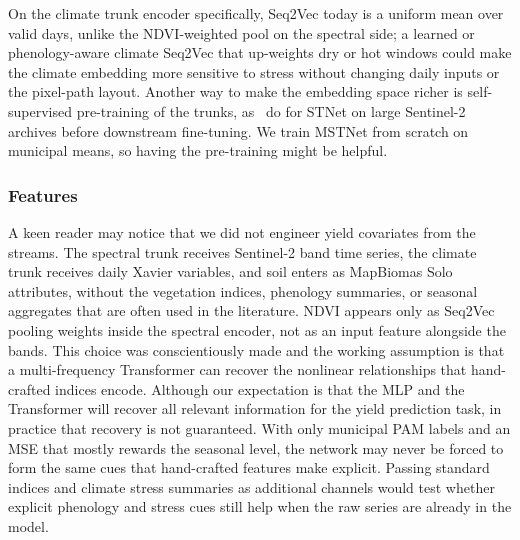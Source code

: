 On the climate trunk encoder specifically, Seq2Vec today is a uniform mean over valid days, unlike the NDVI-weighted pool on the spectral side; a learned or phenology-aware climate Seq2Vec that up-weights dry or hot windows could make the climate embedding more sensitive to stress without changing daily inputs or the pixel-path layout.
Another way to make the embedding space richer is self-supervised pre-training of the trunks, as~\citet{xu2024sitsmoco} do for STNet on large Sentinel-2 archives before downstream fine-tuning. We train MSTNet from scratch on municipal means, so having the pre-training might be helpful.

\subsubsection{Features}
\label{sec:discussion-features}
A keen reader may notice that we did not engineer yield covariates from the streams. The spectral trunk receives Sentinel-2 band time series, the climate trunk receives daily Xavier variables, and soil enters as MapBiomas Solo attributes, without the vegetation indices, phenology summaries, or seasonal aggregates that are often used in the literature.
NDVI appears only as Seq2Vec pooling weights inside the spectral encoder, not as an input feature alongside the bands.
This choice was conscientiously made and the working assumption is that a multi-frequency Transformer can recover the nonlinear relationships that hand-crafted indices encode.
Although our expectation is that the MLP and the Transformer will recover all relevant information for the yield prediction task, in practice that recovery is not guaranteed. With only municipal PAM labels and an MSE that mostly rewards the seasonal level, the network may never be forced to form the same cues that hand-crafted features make explicit.
Passing standard indices and climate stress summaries as additional channels would test whether explicit phenology and stress cues still help when the raw series are already in the model.
